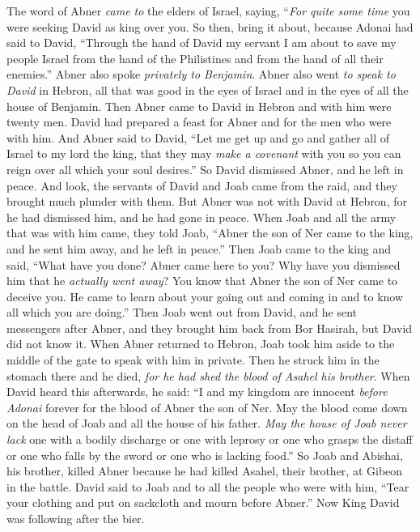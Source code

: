 \begin{biblechapter}
\verse The word of Abner \textit{came to} the elders of Israel, saying, “\textit{For quite some time} you were seeking David as king over you.
\verse So then, bring it about, because Adonai had said to David, “Through the hand of David my servant I am about to save my people Israel from the hand of the Philistines and from the hand of all their enemies.”
\verse Abner also spoke \textit{privately to Benjamin}. Abner also went \textit{to speak to David} in Hebron, all that was good in the eyes of Israel and in the eyes of all the house of Benjamin.
\verse Then Abner came to David in Hebron and with him were twenty men. David had prepared a feast for Abner and for the men who were with him.
\verse And Abner said to David, “Let me get up and go and gather all of Israel to my lord the king, that they may \textit{make a covenant} with you so you can reign over all which your soul desires.” So David dismissed Abner, and he left in peace.
\verse And look, the servants of David and Joab came from the raid, and they brought much plunder with them. But Abner was not with David at Hebron, for he had dismissed him, and he had gone in peace.
\verse When Joab and all the army that was with him came, they told Joab, “Abner the son of Ner came to the king, and he sent him away, and he left in peace.”
 Then Joab came to the king and said, “What have you done? Abner came here to you? Why have you dismissed him that he \textit{actually went away}?
\verse You know that Abner the son of Ner came to deceive you. He came to learn about your going out and coming in and to know all which you are doing.”
\verse Then Joab went out from David, and he sent messengers after Abner, and they brought him back from Bor Hasirah, but David did not know it.
\verse When Abner returned to Hebron, Joab took him aside to the middle of the gate to speak with him in private. Then he struck him in the stomach there and he died, \textit{for he had shed the blood of Asahel his brother}.
\verse When David heard this afterwards, he said: “I and my kingdom are innocent \textit{before Adonai} forever for the blood of Abner the son of Ner.
\verse May the blood come down on the head of Joab and all the house of his father. \textit{May the house of Joab never lack} one with a bodily discharge or one with leprosy or one who grasps the distaff or one who falls by the sword or one who is lacking food.”
\verse So Joab and Abishai, his brother, killed Abner because he had killed Asahel, their brother, at Gibeon in the battle.
\verse David said to Joab and to all the people who were with him, “Tear your clothing and put on sackcloth and mourn before Abner.” Now King David was following after the bier.

\end{biblechapter}
